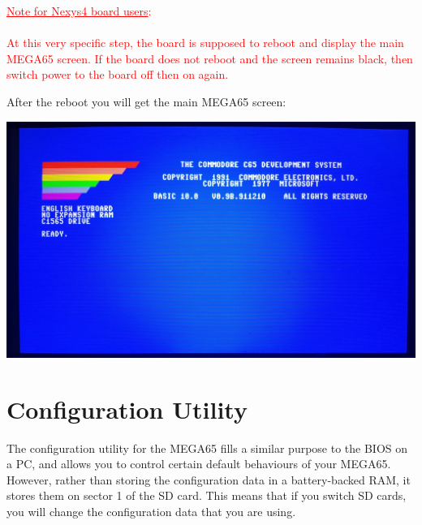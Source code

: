 \textcolor{red}{\underline{Note for Nexys4 board users}: \\
\\
  At this very specific step, the board is supposed to reboot and display the main MEGA65 screen. If the board does not reboot and the screen remains black, then switch power to the board off then on again.}

After the reboot you will get the main MEGA65 screen:

\begin{center}
  \includegraphics[width=\linewidth]{images/img011_final_boot_06.jpg}
\end{center}

\section{Configuration Utility}

The configuration utility for the MEGA65 fills a similar purpose to the BIOS on a
PC, and allows you to control certain default behaviours of your
MEGA65. However, rather than storing the configuration data in a
battery-backed RAM, it stores them on sector 1 of the SD card. This means
that if you switch SD cards, you will change the configuration data that you are using.


